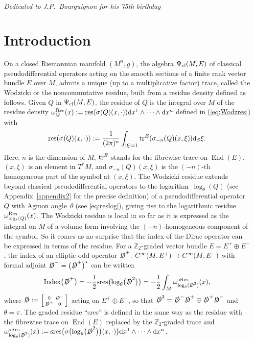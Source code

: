 \documentclass[pdftex]{sigma}
\numberwithin{equation}{section}
\theoremstyle{definition}
\newcommand{\Z}{\mathbb Z}
\begin{document}


\begin{flushright}
{\it Dedicated to J.P.~Bourguignon for his 75th birthday}
\end{flushright}

\renewcommand{\thefootnote}{\arabic{footnote}}
\setcounter{footnote}{0}

\section{Introduction}
On a closed Riemannian manifold $(M^n,g)$, the algebra $\Psi_{\rm cl}(M, E)$ of classical pseudodifferential operators acting on the smooth sections of a finite rank vector bundle $E$ over $M$, admits a unique (up to a multiplicative factor) trace, called the Wodzicki \cite{W} or the noncommutative residue, built from a residue density defined as follows. Given $Q$ in $\Psi_{\rm cl}(M,E)$, the residue of $Q$ is the integral over $M$ of the residue density $\omega_Q^ {\rm Res}(x):= {\rm res}(\sigma(Q)(x, \cdot)) {\rm d}x^1\wedge \dots\wedge {\rm d}x^n$ defined in (\ref{eq:Wodzres}) with
\[
{\rm res}(\sigma(Q)(x, \cdot)):=\frac{1}{(2\pi)^n} \int_{|\xi|=1}{\rm tr}^E(\sigma_{-n}(Q) (x, \xi)) {\rm d}_S\xi .
\]
Here, $n$ is the dimension of $M$, ${\rm tr}^E$ stands for the fibrewise trace on $\operatorname{End}(E)$, $(x,\xi)$ is an element in $T^*M$, and $\sigma_{-n}(Q)(x, \xi)$ is the $(-n)$-th homogeneous part of the symbol at $(x, \xi)$. The Wodzicki residue extends beyond classical pseudodifferential operators to the logarithm~$\log_\theta (Q)$ (see Appendix~\ref{appendix2} for the precise definition) of a pseudodifferential operator $Q$ with Agmon angle~$\theta$ (see \eqref{eq:reslog}), giving rise to the logarithmic residue $\omega_{\log_\theta (Q)}^ {\rm Res}(x)$. The Wodzicki residue is local in so far as it is expressed as the integral on $M$ of a volume form involving the $(-n)$-homogeneous component of the symbol. So it comes as no surprise that the index of the Dirac operator can be expressed in terms of the residue. For a $\Z_2$-graded vector bundle $E=E^+\oplus E^-$, the index of an elliptic odd operator $\slashed D^+\colon C^\infty(M, E^+)\to C^\infty(M, E^-)$ with formal adjoint $\slashed D^-=\bigl(\slashed D^+\bigr)^*$ can be written \cite{Sc}
\[
{\rm Index}\bigl(\slashed D^+\bigr)=-\frac{1}{2}{\rm sres}\bigl(\log _\theta\bigl(\slashed D^2\bigr)\bigr)=-\frac{1}{2} \int_M \omega_{\log_\theta (\slashed D^2)}^{{\rm sRes}}(x),
\]
where $\slashed D:= \left[\begin{smallmatrix}0&\slashed D^-\\
\slashed D^+& 0\end{smallmatrix}\right]$ acting on $E^+\oplus E^-$, so that $\slashed D^2=\slashed D^-\slashed D^+\oplus\slashed D^+\slashed D^-$ and $\theta=\pi$. The graded residue ``sres'' is defined in the same way as the residue with the fibrewise trace on $\operatorname{End}(E)$ replaced by the $\Z_2$-graded trace and $\omega_{\log _\theta(\slashed D^2)}^ {\rm sRes}(x):= {\rm sres}\bigl(\sigma\bigl(\log _\theta\bigl(\slashed D^2\bigr)\bigr)(x, \cdot)\bigr){\rm d}x^1\wedge\dots\wedge {\rm d}x^n$.
\end{document}

